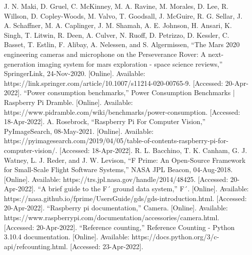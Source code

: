 \documentclass{article}
\begin{document}
\begin{thebibliography}{00}
 J. N. Maki, D. Gruel, C. McKinney, M. A. Ravine, M. Morales, D. Lee, R. Willson, D. Copley-Woods, M. Valvo, T. Goodsall, J. McGuire, R. G. Sellar, J. A. Schaffner, M. A. Caplinger, J. M. Shamah, A. E. Johnson, H. Ansari, K. Singh, T. Litwin, R. Deen, A. Culver, N. Ruoff, D. Petrizzo, D. Kessler, C. Basset, T. Estlin, F. Alibay, A. Nelessen, and S. Algermissen, “The Mars 2020 engineering cameras and microphone on the Perseverance Rover: A next-generation imaging system for mars exploration - space science reviews,” SpringerLink, 24-Nov-2020. [Online]. Available: https://link.springer.com/article/10.1007/s11214-020-00765-9. [Accessed: 20-Apr-2022]. 
 “Power consumption benchmarks,” Power Consumption Benchmarks | Raspberry Pi Dramble. [Online]. Available: https://www.pidramble.com/wiki/benchmarks/power-consumption. [Accessed: 18-Apr-2022].
 A. Rosebrock, “Raspberry Pi For Computer Vision,” PyImageSearch, 08-May-2021. [Online]. Available: https://pyimagesearch.com/2019/04/05/table-of-contents-raspberry-pi-for-computer-vision/. [Accessed: 18-Apr-2022].
 R. L. Bacchino, T. K. Canham, G. J. Watney, L. J. Reder, and J. W. Levison, “F Prime: An Open-Source Framework for Small-Scale Flight Software Systems,” NASA JPL Beacon, 04-Aug-2018. [Online]. Available: https://trs.jpl.nasa.gov/handle/2014/48425. [Accessed: 20-Apr-2022]. 
 “A brief guide to the F´ ground data system,” F´. [Online]. Available: https://nasa.github.io/fprime/UsersGuide/gds/gds-introduction.html. [Accessed: 20-Apr-2022].
 “Raspberry pi documentation,” Camera. [Online]. Available: https://www.raspberrypi.com/documentation/accessories/camera.html. [Accessed: 20-Apr-2022].
 “Reference counting,” Reference Counting - Python 3.10.4 documentation. [Online]. Available: https://docs.python.org/3/c-api/refcounting.html. [Accessed: 23-Apr-2022]. 
\end{thebibliography}
\end{document}
